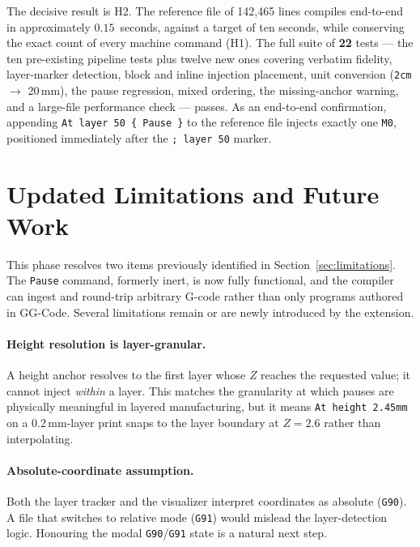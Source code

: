 The decisive result is H2. The reference file of 142{,}465 lines compiles end-to-end in approximately $0.15$~seconds, against a target of ten seconds, while conserving the exact count of every machine command (H1). The full suite of \textbf{22} tests --- the ten pre-existing pipeline tests plus twelve new ones covering verbatim fidelity, layer-marker detection, block and inline injection placement, unit conversion (\texttt{2cm} $\rightarrow$ 20\,mm), the pause regression, mixed ordering, the missing-anchor warning, and a large-file performance check --- passes. As an end-to-end confirmation, appending \texttt{At layer 50 \{ Pause \}} to the reference file injects exactly one \texttt{M0}, positioned immediately after the \texttt{; layer 50} marker.

\section{Updated Limitations and Future Work}

This phase resolves two items previously identified in Section~\ref{sec:limitations}. The \texttt{Pause} command, formerly inert, is now fully functional, and the compiler can ingest and round-trip arbitrary G-code rather than only programs authored in GG-Code. Several limitations remain or are newly introduced by the extension.

\paragraph{Height resolution is layer-granular.}
A height anchor resolves to the first layer whose $Z$ reaches the requested value; it cannot inject \emph{within} a layer. This matches the granularity at which pauses are physically meaningful in layered manufacturing, but it means \texttt{At height 2.45mm} on a 0.2\,mm-layer print snaps to the layer boundary at $Z = 2.6$ rather than interpolating.

\paragraph{Absolute-coordinate assumption.}
Both the layer tracker and the visualizer interpret coordinates as absolute (\texttt{G90}). A file that switches to relative mode (\texttt{G91}) would mislead the layer-detection logic. Honouring the modal \texttt{G90}/\texttt{G91} state is a natural next step.

